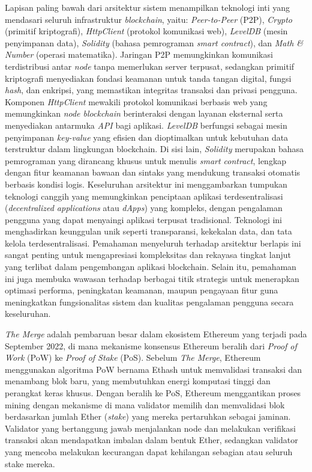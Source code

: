 Lapisan paling bawah dari arsitektur sistem menampilkan teknologi inti yang
mendasari seluruh infrastruktur \emph{blockchain}, yaitu: \emph{Peer-to-Peer}
(P2P), \emph{Crypto} (primitif kriptografi), \emph{HttpClient} (protokol
komunikasi web), \emph{LevelDB} (mesin penyimpanan data), \emph{Solidity}
(bahasa pemrograman \emph{smart contract}), dan \emph{Math \& Number} (operasi
matematika). Jaringan P2P memungkinkan komunikasi terdistribusi antar
\emph{node} tanpa memerlukan server terpusat, sedangkan primitif kriptografi
menyediakan fondasi keamanan untuk tanda tangan digital, fungsi \emph{hash},
dan enkripsi, yang memastikan integritas transaksi dan privasi pengguna.
Komponen \emph{HttpClient} mewakili protokol komunikasi berbasis web yang
memungkinkan \emph{node blockchain} berinteraksi dengan layanan eksternal serta
menyediakan antarmuka \emph{API} bagi aplikasi. \emph{LevelDB} berfungsi
sebagai mesin penyimpanan \emph{key-value} yang efisien dan dioptimalkan untuk
kebutuhan data terstruktur dalam lingkungan blockchain. Di sisi lain,
\emph{Solidity} merupakan bahasa pemrograman yang dirancang khusus untuk
menulis \emph{smart contract}, lengkap dengan fitur keamanan bawaan dan sintaks
yang mendukung transaksi otomatis berbasis kondisi logis. Keseluruhan
arsitektur ini menggambarkan tumpukan teknologi canggih yang memungkinkan
penciptaan aplikasi terdesentralisasi (\emph{decentralized applications} atau
\emph{dApps}) yang kompleks, dengan pengalaman pengguna yang dapat menyaingi
aplikasi terpusat tradisional. Teknologi ini menghadirkan keunggulan unik
seperti transparansi, kekekalan data, dan tata kelola terdesentralisasi.
Pemahaman menyeluruh terhadap arsitektur berlapis ini sangat penting untuk
mengapresiasi kompleksitas dan rekayasa tingkat lanjut yang terlibat dalam
pengembangan aplikasi blockchain. Selain itu, pemahaman ini juga membuka
wawasan terhadap berbagai titik strategis untuk menerapkan optimasi performa,
peningkatan keamanan, maupun pengayaan fitur guna meningkatkan fungsionalitas
sistem dan kualitas pengalaman pengguna secara keseluruhan.

\emph{The Merge} adalah pembaruan besar dalam ekosistem Ethereum yang terjadi pada September 2022, di mana mekanisme konsensus Ethereum beralih dari \emph{Proof of Work} (PoW) ke \emph{Proof of Stake} (PoS). Sebelum \emph{The Merge}, Ethereum menggunakan algoritma PoW bernama Ethash untuk memvalidasi transaksi dan menambang blok baru, yang membutuhkan energi komputasi tinggi dan perangkat keras khusus. Dengan beralih ke PoS, Ethereum menggantikan proses mining dengan mekanisme di mana validator memilih dan memvalidasi blok berdasarkan jumlah Ether (\emph{stake}) yang mereka pertaruhkan sebagai jaminan. Validator yang bertanggung jawab menjalankan node dan melakukan verifikasi transaksi akan mendapatkan imbalan dalam bentuk Ether, sedangkan validator yang mencoba melakukan kecurangan dapat kehilangan sebagian atau seluruh stake mereka.

